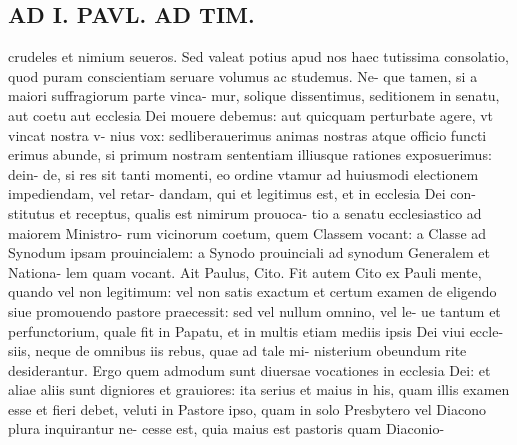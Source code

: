 \documentclass{article}
\begin{document}
\begin{pages}
\section*{AD I. PAVL. AD TIM. }
\marginpar{[ p.340 ]}\pstart crudeles et nimium seueros. Sed valeat potius apud nos haec tutissima consolatio, quod puram conscientiam seruare volumus ac studemus. Ne- que tamen, si a maiori suffragiorum parte vinca- mur, solique dissentimus, seditionem in senatu, aut coetu aut ecclesia Dei mouere debemus: aut quicquam perturbate agere, vt vincat nostra v- nius vox: sedliberauerimus animas nostras atque officio functi erimus abunde, si primum nostram sententiam illiusque rationes exposuerimus: dein- de, si res sit tanti momenti, eo ordine vtamur ad huiusmodi electionem impediendam, vel retar- dandam, qui et legitimus est, et in ecclesia Dei con- stitutus et receptus, qualis est nimirum prouoca- tio a senatu ecclesiastico ad maiorem Ministro- rum vicinorum coetum, quem Classem vocant: a Classe ad Synodum ipsam prouincialem: a Synodo prouinciali ad synodum Generalem et Nationa- lem quam vocant. Ait Paulus, Cito. Fit autem Cito ex Pauli mente, quando vel non legitimum: vel non satis exactum et certum examen de eligendo siue promouendo pastore praecessit: sed vel nullum omnino, vel le- ue tantum et perfunctorium, quale fit in Papatu, et in multis etiam mediis ipsis Dei viui eccle- siis, neque de omnibus iis rebus, quae ad tale mi- nisterium obeundum rite desiderantur. Ergo quem admodum sunt diuersae vocationes in ecclesia Dei: et aliae aliis sunt digniores et grauiores: ita serius et maius in his, quam illis examen esse et fieri debet, veluti in Pastore ipso, quam in solo Presbytero vel Diacono plura inquirantur ne- cesse est, quia maius est pastoris quam Diaconio-  \pend

\end{pages}
\end{document}
